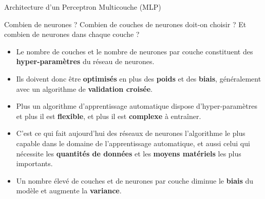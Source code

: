 \begin{frame}{Architecture d'un Perceptron Multicouche (MLP)}
\begin{center}
{
		}
	\end{center}	
\end{frame}

\begin{frame}{Combien de neurones ?}
	Combien de couches de neurones doit-on choisir ? Et combien de neurones dans chaque couche ?
	\begin{itemize}
		\item Le nombre de couches et le nombre de neurones par couche constituent des \textbf{hyper-paramètres} du réseau de neurones.
		\pause
		\item Ils doivent donc être \textbf{optimisés} en plus des \textbf{poids} et des \textbf{biais}, généralement avec un algorithme de \textbf{validation croisée}.
		\pause
		\item Plus un algorithme d'apprentissage automatique dispose d'hyper-paramètres et plus il est \textbf{flexible}, et plus il est \textbf{complexe} à entraîner.
		\pause
		\item C'est ce qui fait aujourd'hui des réseaux de neurones l'algorithme le plus capable dans le domaine de l'apprentissage automatique, et aussi celui qui nécessite les \textbf{quantités de données} et les \textbf{moyens matériels} les plus importants.
		\pause
		\item Un nombre élevé de couches et de neurones par couche diminue le \textbf{biais} du modèle et augmente la \textbf{variance}.
	\end{itemize}
\end{frame}

